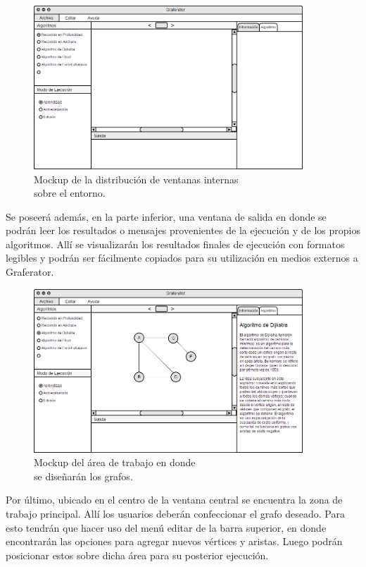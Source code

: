 \documentclass{book}
\begin{document}
\begin{figure}[H]
	\centering
	\includegraphics[width=0.9\textwidth]{images/02-02.png}
	\medskip
	\caption{Mockup de la distribución de ventanas internas \\ sobre el entorno.}
	\medskip
\end{figure}
\bigskip

Se poseerá además, en la parte inferior, una ventana de salida en donde se podrán leer los resultados o mensajes provenientes de la ejecución y de los propios algoritmos. Allí se visualizarán los resultados finales de ejecución con formatos legibles y podrán ser fácilmente copiados para su utilización en medios externos a Graferator.
\bigskip

\begin{figure}[H]
	\centering
	\includegraphics[width=0.9\textwidth]{images/02-03.png}
	\medskip
	\caption{Mockup del área de trabajo en donde \\ se diseñarán los grafos.}
	\medskip
\end{figure}
\bigskip

Por último, ubicado en el centro de la ventana central se encuentra la zona de trabajo principal. Allí los usuarios deberán confeccionar el grafo deseado. Para esto tendrán que hacer uso del menú editar de la barra superior, en donde encontrarán las opciones para agregar nuevos vértices y aristas. Luego podrán posicionar estos sobre dicha área para su posterior ejecución.
\bigskip
\end{document}
